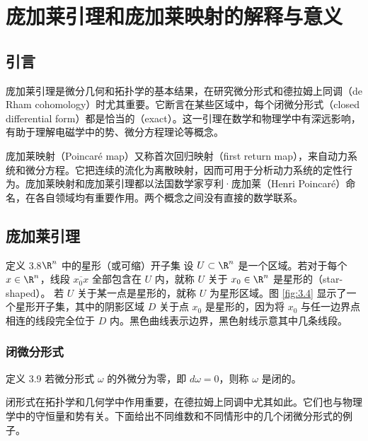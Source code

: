 \section{庞加莱引理和庞加莱映射的解释与意义}
\label{sec:3.8}
\subsection{引言}
庞加莱引理是微分几何和拓扑学的基本结果，在研究微分形式和德拉姆上同调（de Rham cohomology）时尤其重要。它断言在某些区域中，每个闭微分形式（closed differential form）都是恰当的（exact）。这一引理在数学和物理学中有深远影响，有助于理解电磁学中的势、微分方程理论等概念。

庞加莱映射（Poincaré map）又称首次回归映射（first return map），来自动力系统和微分方程。它把连续的流化为离散映射，因而可用于分析动力系统的定性行为。庞加莱映射和庞加莱引理都以法国数学家亨利·庞加莱（Henri Poincaré）命名，在各自领域均有重要作用。两个概念之间没有直接的数学联系。

\subsection{庞加莱引理}
\begin{statement}{定义 3.8}{$\R^n$ 中的星形（或可缩）开子集}
设 $U\subset\R^n$ 是一个区域。若对于每个 $x\in\R^n$，线段 $\overline{x_0x}$ 全部包含在 $U$ 内，就称 $U$ 关于 $x_0\in\R^n$ 是星形的（star-shaped）。%
%
若 $U$ 关于某一点是星形的，就称 $U$ 为星形区域。图 \ref{fig:3.4} 显示了一个星形开子集，其中的阴影区域 $D$ 关于点 $x_0$ 是星形的，因为将 $x_0$ 与任一边界点相连的线段完全位于 $D$ 内。黑色曲线表示边界，黑色射线示意其中几条线段。%
\end{statement}
\begin{figure}[htbp]
\centering

\end{figure}

\subsubsection{闭微分形式}
\begin{statement}{定义 3.9}{}
若微分形式 $\omega$ 的外微分为零，即 $d\omega=0$，则称 $\omega$ 是闭的。

闭形式在拓扑学和几何学中作用重要，在德拉姆上同调中尤其如此。它们也与物理学中的守恒量和势有关。下面给出不同维数和不同情形中的几个闭微分形式的例子。
\end{statement}

